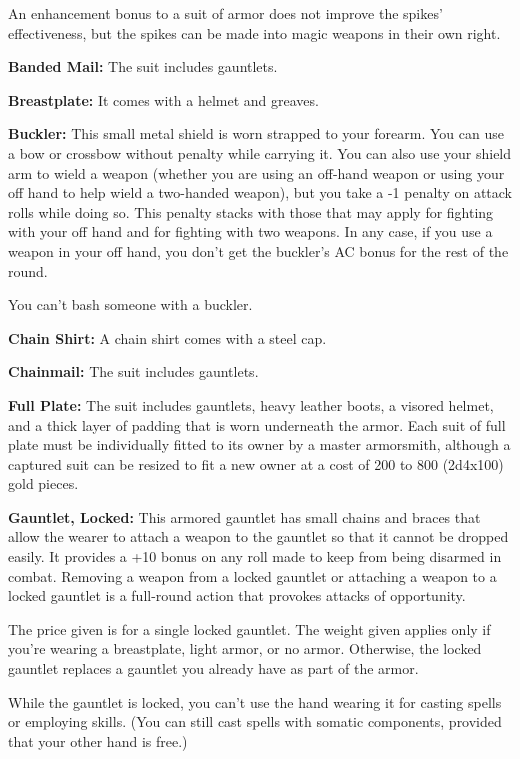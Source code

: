 \documentclass{article}
\begin{document}
An enhancement bonus to a suit of armor does not improve the spikes' effectiveness, 
but the spikes can be made into magic weapons in their own right.

\textbf{Banded Mail: }The suit includes gauntlets.

\textbf{Breastplate: }It comes with a helmet and greaves. 

\textbf{Buckler:} This small metal shield is worn strapped to your forearm. You 
can use a bow or crossbow without penalty while carrying it. You can also use your 
shield arm to wield a weapon (whether you are using an off-hand weapon or using 
your off hand to help wield a two-handed weapon), but you take a -1 penalty on 
attack rolls while doing so. This penalty stacks with those that may apply for 
fighting with your off hand and for fighting with two weapons. In any case, if 
you use a weapon in your off hand, you don't get the buckler's AC bonus for the 
rest of the round.

You can't bash someone with a buckler.

\textbf{Chain Shirt: }A chain shirt comes with a steel cap.

\textbf{Chainmail: }The suit includes gauntlets.

\textbf{Full Plate:} The suit includes gauntlets, heavy leather boots, a visored 
helmet, and a thick layer of padding that is worn underneath the armor. Each suit 
of full plate must be individually fitted to its owner by a master armorsmith, 
although a captured suit can be resized to fit a new owner at a cost of 200 to 
800 (2d4x100) gold pieces.

\textbf{Gauntlet, Locked:} This armored gauntlet has small chains and braces that 
allow the wearer to attach a weapon to the gauntlet so that it cannot be dropped 
easily. It provides a +10 bonus on any roll made to keep from being disarmed in 
combat. Removing a weapon from a locked gauntlet or attaching a weapon to a locked 
gauntlet is a full-round action that provokes attacks of opportunity.

The price given is for a single locked gauntlet. The weight given applies only 
if you're wearing a breastplate, light armor, or no armor. Otherwise, the locked 
gauntlet replaces a gauntlet you already have as part of the armor.

While the gauntlet is locked, you can't use the hand wearing it for casting spells 
or employing skills. (You can still cast spells with somatic components, provided 
that your other hand is free.)
\end{document}
